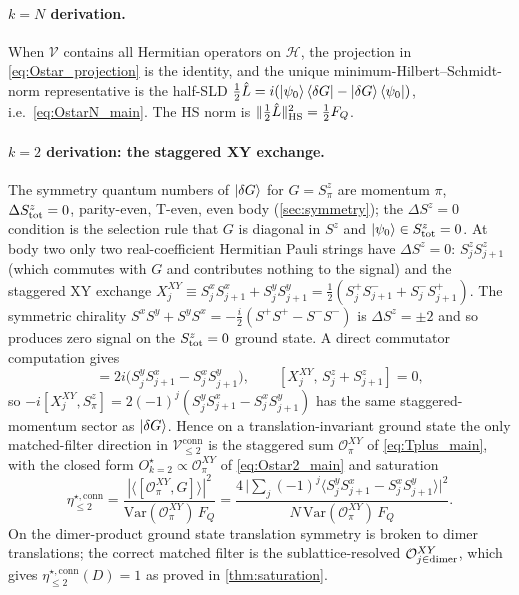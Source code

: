 \documentclass[11pt,a4paper]{article}
\newcommand{\FQ}{F_Q}
\newcommand{\Var}{\mathrm{Var}}
\newcommand{\SLD}{\hat{L}}
\newcommand{\PsiZ}{\ket{\psi_0}}
\newcommand{\BraZ}{\bra{\psi_0}}
\newcommand{\dG}{\ket{\delta G}}
\newcommand{\dGb}{\bra{\delta G}}
\newcommand{\Vconn}[1]{\mathcal{V}^{\mathrm{conn}}_{\le #1}}
\newcommand{\etaconn}[1]{\eta^{\star,\mathrm{conn}}_{\le #1}}
\begin{document}
\paragraph{$k=N$ derivation.}  When $\mathcal V$ contains all
Hermitian operators on $\mathcal H$, the projection in
\eqref{eq:Ostar_projection} is the identity, and the unique
minimum-Hilbert--Schmidt-norm representative is the half-SLD
$\tfrac12\SLD=i(\PsiZ\dGb-\dG\BraZ)$, i.e.\
\eqref{eq:OstarN_main}.  The HS norm is
$\Vert\tfrac12\SLD\Vert_{\rm HS}^2=\tfrac12\FQ$.

\paragraph{$k=2$ derivation: the staggered XY exchange.}
The symmetry quantum numbers of $\dG$ for $G=S^z_\pi$ are
momentum $\pi$, $\Delta S^z_{\rm tot}=0$, parity-even, T-even,
even body (\cref{sec:symmetry}); the $\Delta S^z=0$ condition is
the selection rule that $G$ is diagonal in $S^z$ and
$\PsiZ\in S^z_{\rm tot}=0$.  At body two only two real-coefficient
Hermitian Pauli strings have $\Delta S^z=0$:
$S^z_jS^z_{j+1}$ (which commutes with $G$ and contributes nothing
to the signal) and the staggered XY exchange
$X^{XY}_j\equiv S^x_jS^x_{j+1}+S^y_jS^y_{j+1}=\tfrac12(S^+_jS^-_{j+1}+S^-_jS^+_{j+1})$.
The symmetric chirality $S^xS^y+S^yS^x=-\tfrac{i}{2}(S^+S^+-S^-S^-)$
is $\Delta S^z=\pm 2$ and so produces zero signal on the
$S^z_{\rm tot}=0$ ground state.  A direct commutator computation
gives
\begin{equation}
   [X^{XY}_j,\,S^z_j-S^z_{j+1}]
   =2i\bigl(S^y_jS^x_{j+1}-S^x_jS^y_{j+1}\bigr),\qquad
   [X^{XY}_j,\,S^z_j+S^z_{j+1}]=0,
   \label{eq:XY_commutator}
\end{equation}
so $-i[X^{XY}_j,S^z_\pi]=2(-1)^j(S^y_jS^x_{j+1}-S^x_jS^y_{j+1})$
has the same staggered-momentum sector as $\dG$.  Hence on a
translation-invariant ground state the only matched-filter
direction in $\Vconn{2}$ is the staggered sum
$\mathcal O^{XY}_\pi$ of \eqref{eq:Tplus_main}, with the closed
form $O^\star_{k=2}\propto\mathcal O^{XY}_\pi$ of
\eqref{eq:Ostar2_main} and saturation
\begin{equation}
   \etaconn{2}
   =\frac{|\langle[\mathcal O^{XY}_\pi,G]\rangle|^2}
        {\Var(\mathcal O^{XY}_\pi)\,\FQ}
   =\frac{4\,\bigl|\sum_j(-1)^j\langle S^y_jS^x_{j+1}-S^x_jS^y_{j+1}\rangle\bigr|^2}
        {N\,\Var(\mathcal O^{XY}_\pi)\,\FQ}.
   \label{eq:eta2_closed}
\end{equation}
On the dimer-product ground state translation symmetry is broken
to dimer translations; the correct matched filter is the
sublattice-resolved $\mathcal O^{XY}_{j\in\rm dimer}$, which
gives $\etaconn{2}(D)=1$ as proved in \cref{thm:saturation}.
\end{document}
